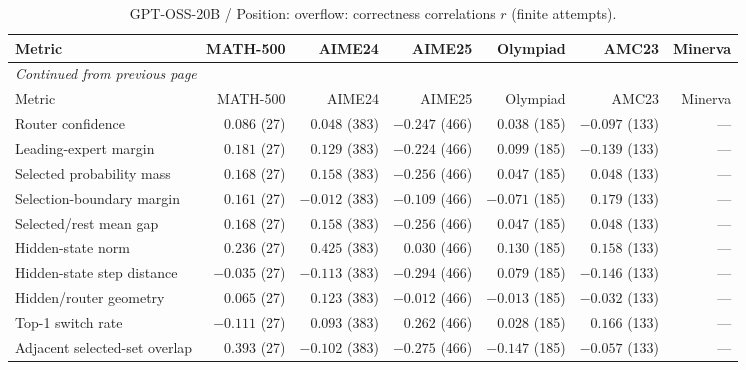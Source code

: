 \begingroup\scriptsize\setlength{\tabcolsep}{4pt}
\begin{longtable}{@{}lrrrrrr@{}}
\caption{GPT-OSS-20B / Position: overflow: correctness correlations $r$ (finite attempts).}\label{tab:multi-gptoss-position-overflow}\\
\toprule
Metric & MATH-500 & AIME24 & AIME25 & Olympiad & AMC23 & Minerva \\
\midrule\endfirsthead
\multicolumn{7}{l}{\textit{Continued from previous page}}\\
\toprule
Metric & MATH-500 & AIME24 & AIME25 & Olympiad & AMC23 & Minerva \\
\midrule\endhead
\bottomrule\endfoot
Router confidence & $0.086$ (27) & $0.048$ (383) & $-0.247$ (466) & $0.038$ (185) & $-0.097$ (133) & --- \\
Leading-expert margin & $0.181$ (27) & $0.129$ (383) & $-0.224$ (466) & $0.099$ (185) & $-0.139$ (133) & --- \\
Selected probability mass & $0.168$ (27) & $0.158$ (383) & $-0.256$ (466) & $0.047$ (185) & $0.048$ (133) & --- \\
Selection-boundary margin & $0.161$ (27) & $-0.012$ (383) & $-0.109$ (466) & $-0.071$ (185) & $0.179$ (133) & --- \\
Selected/rest mean gap & $0.168$ (27) & $0.158$ (383) & $-0.256$ (466) & $0.047$ (185) & $0.048$ (133) & --- \\
Hidden-state norm & $0.236$ (27) & $0.425$ (383) & $0.030$ (466) & $0.130$ (185) & $0.158$ (133) & --- \\
Hidden-state step distance & $-0.035$ (27) & $-0.113$ (383) & $-0.294$ (466) & $0.079$ (185) & $-0.146$ (133) & --- \\
Hidden/router geometry & $0.065$ (27) & $0.123$ (383) & $-0.012$ (466) & $-0.013$ (185) & $-0.032$ (133) & --- \\
Top-1 switch rate & $-0.111$ (27) & $0.093$ (383) & $0.262$ (466) & $0.028$ (185) & $0.166$ (133) & --- \\
Adjacent selected-set overlap & $0.393$ (27) & $-0.102$ (383) & $-0.275$ (466) & $-0.147$ (185) & $-0.057$ (133) & --- \\
\end{longtable}\endgroup

